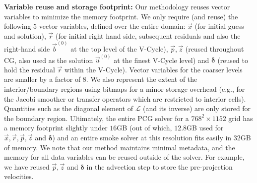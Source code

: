 \noindent\textbf{Variable reuse and storage footprint:} Our methodology reuses vector variables to minimize the memory footprint. We only
require (and reuse) the following 5 vector variables, defined over the entire domain: $\vec{x}$ (for initial guess and solution), $\vec{r}$ (for initial right hand side, subsequent residuals and also
the right-hand side $\vec{b}^{(0)}$ at the top level of the V-Cycle), $\vec{p},\vec{z}$ (reused throughout CG, also used as the solution $\vec{u}^{(0)}$ at the finest V-Cycle level)
and $\boldsymbol{\delta}$ (reused to hold the residual $\vec{r}$ within the V-Cycle). Vector variables
for the coarser levels are smaller by a factor of 8. We also represent the extent of the interior/boundary regions using bitmaps
for a minor storage overhead (e.g., for the Jacobi smoother or transfer operators which are restricted to interior cells). Quantities such as the diagonal element of $\mathcal{L}$ (and
its inverse) are only stored for the boundary region. Ultimately, the entire PCG solver for a $768^2\times 1152$ grid has a memory footprint slightly under $16$GB (out of which, $12.8$GB
used for $\vec{x},\vec{r},\vec{p},\vec{z}$ and $\boldsymbol{\delta}$) and an entire smoke solver at this resolution fits easily in $32$GB of memory. We note that our method maintains minimal
metadata, and the memory for all data variables can be reused outside of the solver. For example, we have reused $\vec{p},\vec{z}$ and $\boldsymbol{\delta}$ in the
advection step to store the pre-projection velocities.

